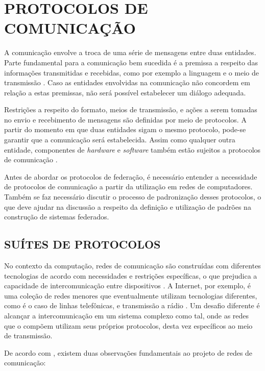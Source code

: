 \chapter{PROTOCOLOS DE COMUNICAÇÃO}

A comunicação envolve a troca de uma série de mensagens entre duas entidades. Parte
fundamental para a comunicação bem sucedida é a premissa a respeito das informações
transmitidas e recebidas, como por exemplo a linguagem e o meio de transmissão
\cite{comer2000}. Caso as entidades envolvidas na comunicação não concordem em
relação a estas premissas, não será possível estabelecer um diálogo adequada.

Restrições a respeito do formato, meios de transmissão, e ações a serem tomadas no
envio e recebimento de mensagens são definidas por meio de protocolos. A partir do
momento em que duas entidades sigam o mesmo protocolo, pode-se garantir que a
comunicação será estabelecida. Assim como qualquer outra entidade, componentes de
\textit{hardware} e \textit{software} também estão sujeitos a protocolos de
comunicação \cite{kurose2012}.

Antes de abordar os protocolos de federação, é necessário entender a necessidade de
protocolos de comunicação a partir da utilização em redes de computadores. Também se
faz necessário discutir o processo de padronização desses protocolos, o que deve
ajudar na discussão a respeito da definição e utilização de padrões na construção de
sistemas federados. 



\section{SUÍTES DE PROTOCOLOS}

No contexto da computação, redes de comunicação são construídas com diferentes
tecnologias de acordo com necessidades e restrições específicas, o que prejudica a
capacidade de intercomunicação entre dispositivos \cite{comer2000}. A Internet, por
exemplo, é uma coleção de redes menores que eventualmente utilizam tecnologias
diferentes, como é o caso de linhas telefônicas, e transmissão a rádio
\cite{tanenbaum2010}. Um desafio diferente é alcançar a intercomunicação em um
sistema complexo como tal, onde as redes que o compõem utilizam seus próprios
protocolos, desta vez específicos ao meio de transmissão.

De acordo com \cite{comer2000}, existem duas observações fundamentais ao projeto de
redes de comunicação:

